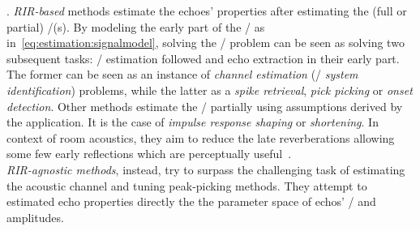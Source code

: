 .
\textit{RIR-based} methods estimate the echoes' properties after estimating the (full or partial) \RIR/(s).
By modeling the early part of the \RIR/ as in~\cref{eq:estimation:signalmodel}, solving the \AER/ problem can be seen as solving two subsequent tasks: \RIR/ estimation followed and echo extraction in their early part.
The former can be seen as an instance of \textit{channel estimation} (\aka/ \textit{system identification}) problems, while the latter as a \textit{spike retrieval}, \textit{pick picking} or \textit{onset detection}.
Other methods estimate the \RIRs/ partially using assumptions derived by the application.
It is the case of \textit{impulse response shaping} or \textit{shortening}.
In context of room acoustics, they aim to reduce the late reverberations allowing some few early reflections which are perceptually useful~.
\\\textit{RIR-agnostic methods}, instead, try to surpass the challenging task of estimating the acoustic channel and tuning peak-picking methods.
They attempt to estimated echo properties directly the the parameter space of echos' \TOAs/ and amplitudes.

\begin{figure}[h]
    \footnotesize
    \resizebox{\linewidth}{!}{
        
    }
    \vspace{-\baselineskip}\vspace{-\baselineskip}
\end{figure}



